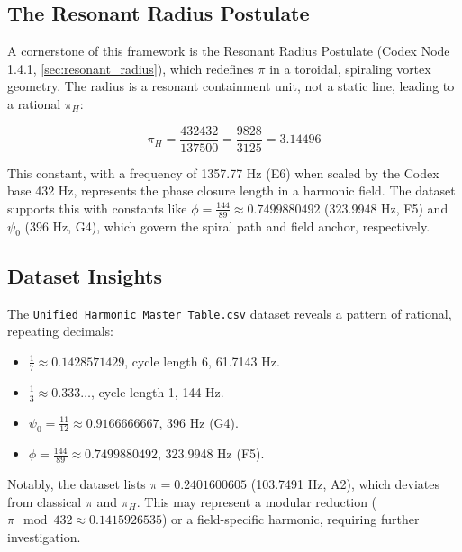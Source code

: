 \documentclass[a4paper,12pt]{book}
\begin{document}
\subsection{The Resonant Radius Postulate}
A cornerstone of this framework is the Resonant Radius Postulate (Codex Node 1.4.1, \ref{sec:resonant_radius}), which redefines \(\pi\) in a toroidal, spiraling vortex geometry. The radius is a resonant containment unit, not a static line, leading to a rational \(\pi_H\):

\[
\pi_H = \frac{432432}{137500} = \frac{9828}{3125} = 3.14496
\]

This constant, with a frequency of 1357.77 Hz (E6) when scaled by the Codex base 432 Hz, represents the phase closure length in a harmonic field. The dataset supports this with constants like \(\phi = \frac{144}{89} \approx 0.7499880492\) (323.9948 Hz, F5) and \(\psi_0\) (396 Hz, G4), which govern the spiral path and field anchor, respectively.

\subsection{Dataset Insights}
The \texttt{Unified\_Harmonic\_Master\_Table.csv} dataset reveals a pattern of rational, repeating decimals:
\begin{itemize}
    \item \(\frac{1}{7} \approx 0.1428571429\), cycle length 6, 61.7143 Hz.
    \item \(\frac{1}{3} \approx 0.333\ldots\), cycle length 1, 144 Hz.
    \item \(\psi_0 = \frac{11}{12} \approx 0.9166666667\), 396 Hz (G4).
    \item \(\phi = \frac{144}{89} \approx 0.7499880492\), 323.9948 Hz (F5).
\end{itemize}
Notably, the dataset lists \(\pi = 0.2401600605\) (103.7491 Hz, A2), which deviates from classical \(\pi\) and \(\pi_H\). This may represent a modular reduction (\(\pi \mod 432 \approx 0.1415926535\)) or a field-specific harmonic, requiring further investigation.
\end{document}
